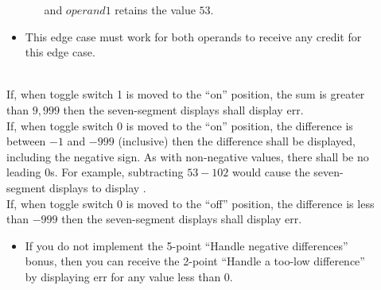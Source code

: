 \begin{description}
\begin{itemize}
\begin{itemize}
                and $operand1$ retains the value $53$.
        \end{itemize}
        \item This edge case must work for both operands to receive any credit
            for this edge case.
    \end{itemize}
 \\
        If, when toggle switch 1 is moved to the ``on'' position, the sum is
        greater than $9,999$ then the seven-segment displays shall display
        {\dviiseg err}.
 \\
        If, when toggle switch 0 is moved to the ``on'' position, the
        difference is between $-1$ and $- 999$ (inclusive) then the difference
        shall be displayed, including the negative sign. As with non-negative
        values, there shall be no leading $0$s. For example, subtracting
        $53-102$ would cause the seven-segment displays to display
        {}.
 \\
        If, when toggle switch 0 is moved to the ``off'' position, the
        difference is less than $-999$ then the seven-segment displays shall
        display {\dviiseg err}.
    \begin{itemize}
        \item If you do not implement the 5-point ``Handle negative
        differences'' bonus, then you can receive the 2-point ``Handle a
        too-low difference'' by displaying {\dviiseg err} for any value less
        than $0$.
    \end{itemize}
\end{description}


